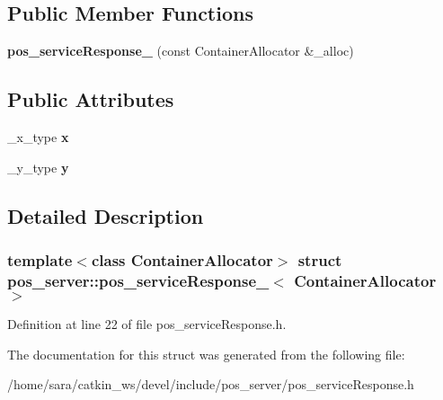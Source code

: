 \subsection*{Public Member Functions}
\begin{DoxyCompactItemize}
\item 
\mbox{\label{structpos__server_1_1pos__serviceResponse___a435bcd6e4a441216ab744bb8a3a2ac66}} 
{\bfseries pos\+\_\+service\+Response\+\_\+} (const Container\+Allocator \&\+\_\+alloc)
\end{DoxyCompactItemize}
\subsection*{Public Attributes}
\begin{DoxyCompactItemize}
\item 
\mbox{\label{structpos__server_1_1pos__serviceResponse___ac93630dbfd4e99ffe97c44e6e0ed88d2}} 
\+\_\+x\+\_\+type {\bfseries x}
\item 
\mbox{\label{structpos__server_1_1pos__serviceResponse___ae1fd9d4a36857ddf260244cdbba942da}} 
\+\_\+y\+\_\+type {\bfseries y}
\end{DoxyCompactItemize}


\subsection{Detailed Description}
\subsubsection*{template$<$class Container\+Allocator$>$\newline
struct pos\+\_\+server\+::pos\+\_\+service\+Response\+\_\+$<$ Container\+Allocator $>$}



Definition at line 22 of file pos\+\_\+service\+Response.\+h.



The documentation for this struct was generated from the following file\+:\begin{DoxyCompactItemize}
\item 
/home/sara/catkin\+\_\+ws/devel/include/pos\+\_\+server/pos\+\_\+service\+Response.\+h\end{DoxyCompactItemize}
